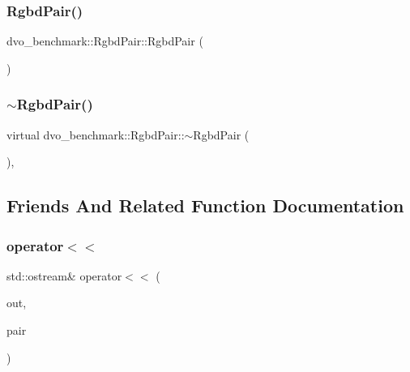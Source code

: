\subsubsection{\texorpdfstring{Rgbd\+Pair()}{RgbdPair()}}
{\footnotesize\ttfamily dvo\+\_\+benchmark\+::\+Rgbd\+Pair\+::\+Rgbd\+Pair (\begin{DoxyParamCaption}{ }\end{DoxyParamCaption})\hspace{0.3cm}{\ttfamily [inline]}}

\mbox{\label{classdvo__benchmark_1_1_rgbd_pair_a248ac100565f5fdac27ac3ce030a90b6}} 
\subsubsection{\texorpdfstring{$\sim$\+Rgbd\+Pair()}{~RgbdPair()}}
{\footnotesize\ttfamily virtual dvo\+\_\+benchmark\+::\+Rgbd\+Pair\+::$\sim$\+Rgbd\+Pair (\begin{DoxyParamCaption}{ }\end{DoxyParamCaption})\hspace{0.3cm}{\ttfamily [inline]}, {\ttfamily [virtual]}}



\subsection{Friends And Related Function Documentation}
\mbox{\label{classdvo__benchmark_1_1_rgbd_pair_a7309c27c80c3c07f52094a16a90d2f56}} 
\subsubsection{\texorpdfstring{operator$<$$<$}{operator<<}}
{\footnotesize\ttfamily std\+::ostream\& operator$<$$<$ (\begin{DoxyParamCaption}\item[{std\+::ostream \&}]{out,  }\item[{const \mbox{\hyperlink{classdvo__benchmark_1_1_rgbd_pair}{Rgbd\+Pair}} \&}]{pair }\end{DoxyParamCaption})\hspace{0.3cm}{\ttfamily [friend]}}

